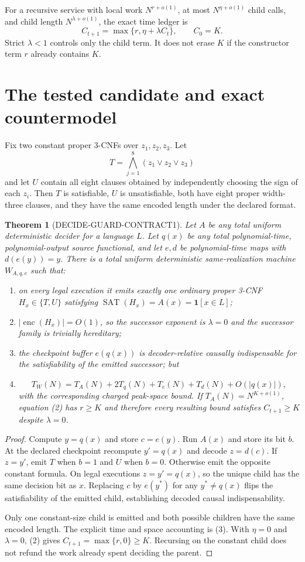 \documentclass[11pt]{article}
\newtheorem{theorem}{Theorem}
\begin{document}
For a recursive service with local work $N^{r+o(1)}$, at most
$N^{\eta+o(1)}$ child calls, and child length $N^{\lambda+o(1)}$, the exact
time ledger is
\[
C_{t+1}=\max\{r,\eta+\lambda C_t\},\qquad C_0=K.             \tag{2}
\]
Strict $\lambda<1$ controls only the child term.  It does not erase $K$ if
the constructor term $r$ already contains $K$.

\section{The tested candidate and exact countermodel}
Fix two constant proper 3-CNFs over $z_1,z_2,z_3$.  Let
\[
T=\bigwedge_{j=1}^{8}(z_1\vee z_2\vee z_3)
\]
and let $U$ contain all eight clauses obtained by independently choosing the
sign of each $z_i$.  Then $T$ is satisfiable, $U$ is unsatisfiable, both have
eight proper width-three clauses, and they have the same encoded length under
the declared format.

\begin{theorem}[DECIDE-GUARD-CONTRACT1]
Let $A$ be any total uniform deterministic decider for a language $L$.  Let
$q(x)$ be any total polynomial-time, polynomial-output source functional, and
let $e,d$ be polynomial-time maps with $d(e(y))=y$.  There is a total uniform
deterministic same-realization machine $W_{A,q,e}$ such that:
\begin{enumerate}
\item on every legal execution it emits exactly one ordinary proper 3-CNF
$H_x\in\{T,U\}$ satisfying
$\operatorname{SAT}(H_x)=A(x)=\mathbf 1[x\in L]$;
\item $|\operatorname{enc}(H_x)|=O(1)$, so the successor exponent is
$\lambda=0$ and the successor family is trivially hereditary;
\item the checkpoint buffer $e(q(x))$ is decoder-relative causally
indispensable for the satisfiability of the emitted successor; but
\item
\[
T_W(N)=T_A(N)+2T_q(N)+T_e(N)+T_d(N)+O(|q(x)|),              \tag{3}
\]
with the corresponding charged peak-space bound.  If
$T_A(N)=N^{K+o(1)}$, equation (2) has $r\ge K$ and therefore every resulting
bound satisfies $C_{t+1}\ge K$ despite $\lambda=0$.
\end{enumerate}
\end{theorem}

\begin{proof}
Compute $y=q(x)$ and store $c=e(y)$.  Run $A(x)$ and store its bit $b$.
At the declared checkpoint recompute $y'=q(x)$ and decode $z=d(c)$.  If
$z=y'$, emit $T$ when $b=1$ and $U$ when $b=0$.  Otherwise emit the opposite
constant formula.  On legal executions $z=y'=q(x)$, so the unique child has
the same decision bit as $x$.  Replacing $c$ by $e(y^*)$ for any
$y^*\ne q(x)$ flips the satisfiability of the emitted child, establishing
decoded causal indispensability.

Only one constant-size child is emitted and both possible children have the
same encoded length.  The explicit time and space accounting is (3).  With
$\eta=0$ and $\lambda=0$, (2) gives
$C_{t+1}=\max\{r,0\}\ge K$.  Recursing on the constant child does not refund
the work already spent deciding the parent.
\end{proof}
\end{document}
